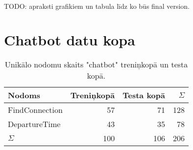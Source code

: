 TODO: apraksti grafikiem un tabula līdz ko būs final version.

\section{Chatbot datu kopa}

\begin{table}[htbp]
  \centering
  \caption{Unikālo nodomu skaits "chatbot" treniņkopā un testa kopā.}
    \begin{tabular}{lrrr} \toprule
    Nodoms & Treniņkopā & Testa kopā & $\Sigma$ \\\midrule
    FindConnection & 57    & 71 & 128 \\
    DepartureTime & 43    & 35 & 78 \\
    $\Sigma$ & 100    & 106 & 206 \\\bottomrule
    \end{tabular}%
  \label{tab:chatbot-labels}%
\end{table}%







